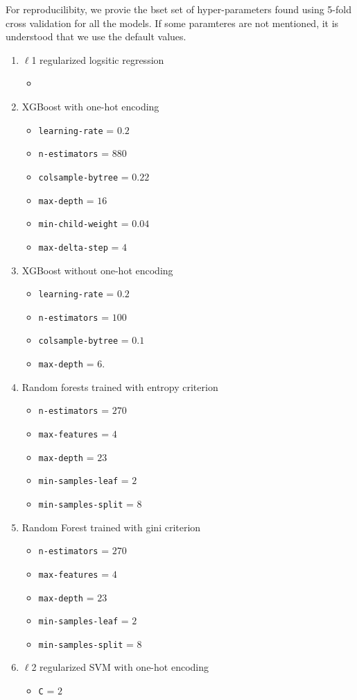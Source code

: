 \documentclass{article}
\begin{document}
For reproducilibity, we provie the bset set of hyper-parameters found using 5-fold cross validation for all the models. If some paramteres are not mentioned, it is understood that we use the default values. 

\begin{enumerate}
	\item $\ell$1 regularized logsitic regression
		\begin{itemize} \itemsep0em
			\item 		
		\end{itemize}
	\item XGBoost with one-hot encoding
		\begin{itemize} \itemsep0em
			\item \texttt{learning-rate} = $0.2$
			\item \texttt{n-estimators} = $880$
			\item \texttt{colsample-bytree} = $0.22$
			\item \texttt{max-depth} = $16$
			\item \texttt{min-child-weight} = $0.04$
			\item \texttt{max-delta-step} = $4$			
		\end{itemize}
	\item XGBoost without one-hot encoding
		\begin{itemize} \itemsep0em
			\item \texttt{learning-rate} = $0.2$
			\item \texttt{n-estimators} = $100$
			\item \texttt{colsample-bytree} = $0.1$
			\item \texttt{max-depth} = $6$.
		\end{itemize}
	\item Random forests trained with entropy criterion
		\begin{itemize}
			\item \texttt{n-estimators} = $270$
			\item \texttt{max-features} = $4$
			\item \texttt{max-depth} = $23$
			\item \texttt{min-samples-leaf} = $2$
			\item \texttt{min-samples-split} = $8$
		\end{itemize}
	\item Random Forest trained with gini criterion
		\begin{itemize}
			\item \texttt{n-estimators} = $270$
			\item \texttt{max-features} = $4$
			\item \texttt{max-depth} = $23$
			\item \texttt{min-samples-leaf} = $2$
			\item \texttt{min-samples-split} = $8$
		\end{itemize}

	\item $\ell$2 regularized SVM with one-hot encoding
		\begin{itemize}
			\item \texttt{C} = $2$		
		\end{itemize}
\end{enumerate}
\end{document}
